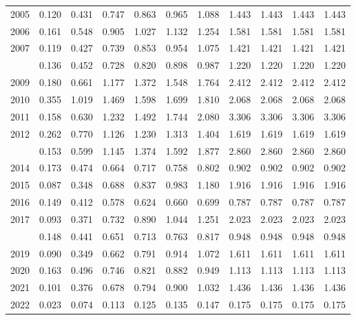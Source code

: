 \documentclass[
]{article}
\begin{document}
\begin{longtable}[t]{lrrrrrrrrrr}
2005 & 0.120 & 0.431 & 0.747 & 0.863 & 0.965 & 1.088 & 1.443 & 1.443 & 1.443 & 1.443\\
2006 & 0.161 & 0.548 & 0.905 & 1.027 & 1.132 & 1.254 & 1.581 & 1.581 & 1.581 & 1.581\\
2007 & 0.119 & 0.427 & 0.739 & 0.853 & 0.954 & 1.075 & 1.421 & 1.421 & 1.421 & 1.421\\
\addlinespace
2008 & 0.136 & 0.452 & 0.728 & 0.820 & 0.898 & 0.987 & 1.220 & 1.220 & 1.220 & 1.220\\
2009 & 0.180 & 0.661 & 1.177 & 1.372 & 1.548 & 1.764 & 2.412 & 2.412 & 2.412 & 2.412\\
2010 & 0.355 & 1.019 & 1.469 & 1.598 & 1.699 & 1.810 & 2.068 & 2.068 & 2.068 & 2.068\\
2011 & 0.158 & 0.630 & 1.232 & 1.492 & 1.744 & 2.080 & 3.306 & 3.306 & 3.306 & 3.306\\
2012 & 0.262 & 0.770 & 1.126 & 1.230 & 1.313 & 1.404 & 1.619 & 1.619 & 1.619 & 1.619\\
\addlinespace
2013 & 0.153 & 0.599 & 1.145 & 1.374 & 1.592 & 1.877 & 2.860 & 2.860 & 2.860 & 2.860\\
2014 & 0.173 & 0.474 & 0.664 & 0.717 & 0.758 & 0.802 & 0.902 & 0.902 & 0.902 & 0.902\\
2015 & 0.087 & 0.348 & 0.688 & 0.837 & 0.983 & 1.180 & 1.916 & 1.916 & 1.916 & 1.916\\
2016 & 0.149 & 0.412 & 0.578 & 0.624 & 0.660 & 0.699 & 0.787 & 0.787 & 0.787 & 0.787\\
2017 & 0.093 & 0.371 & 0.732 & 0.890 & 1.044 & 1.251 & 2.023 & 2.023 & 2.023 & 2.023\\
\addlinespace
2018 & 0.148 & 0.441 & 0.651 & 0.713 & 0.763 & 0.817 & 0.948 & 0.948 & 0.948 & 0.948\\
2019 & 0.090 & 0.349 & 0.662 & 0.791 & 0.914 & 1.072 & 1.611 & 1.611 & 1.611 & 1.611\\
2020 & 0.163 & 0.496 & 0.746 & 0.821 & 0.882 & 0.949 & 1.113 & 1.113 & 1.113 & 1.113\\
2021 & 0.101 & 0.376 & 0.678 & 0.794 & 0.900 & 1.032 & 1.436 & 1.436 & 1.436 & 1.436\\
2022 & 0.023 & 0.074 & 0.113 & 0.125 & 0.135 & 0.147 & 0.175 & 0.175 & 0.175 & 0.175\\*
\end{longtable}
\end{document}
